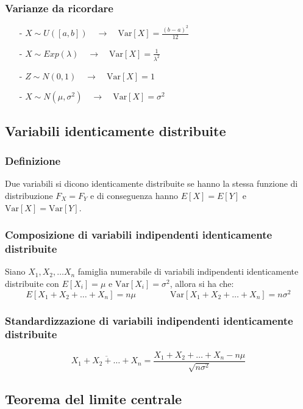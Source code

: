 \documentclass[a4paper]{article}
\newcommand\var{\text{Var}}   %
\begin{document}
\subsubsection*{Varianze da ricordare}
\begin{itemize}[topsep=3pt, itemsep=0pt]
	\item[-] \(X \sim U([a,b]) \quad \rightarrow \quad \var[X] = \displaystyle\frac{(b-a)^2}{12}\)
	\item[-] \(X \sim Exp(\lambda) \quad \rightarrow \quad \var[X] = \displaystyle\frac{1}{\lambda^2}\)
	\item[-] \(Z \sim N(0,1) \quad \rightarrow \quad \var[X] = 1\)
	\item[-] \(X \sim N(\mu,\sigma^2) \quad \rightarrow \quad \var[X] = \sigma^2\)
\end{itemize}

\subsection{Variabili identicamente distribuite}
\subsubsection*{Definizione}
Due variabili si dicono identicamente distribuite se hanno la stessa funzione di distribuzione \(F_X = F_Y\) e di conseguenza
hanno \(E[X] = E[Y]\) e \(\var[X] = \var[Y]\).

\subsubsection*{Composizione di variabili indipendenti identicamente distribuite}
Siano \(X_1, X_2, \dots X_n\) famiglia numerabile di variabili indipendenti identicamente distribuite con \(E[X_i] = \mu\) e
\(\var[X_i] = \sigma^2\), allora si ha che:
\[E[X_1 + X_2 + \dots + X_n] = n \mu \qquad \qquad \var[X_1 + X_2 + \dots + X_n] = n \sigma^2\]

\subsubsection*{Standardizzazione di variabili indipendenti identicamente distribuite}
\[\overline{X_1 + X_2 + \dots + X_n} = \frac{X_1 + X_2 + \dots + X_n - n \mu}{\sqrt{n \sigma^2}}\]

\subsection{Teorema del limite centrale}
\end{document}
